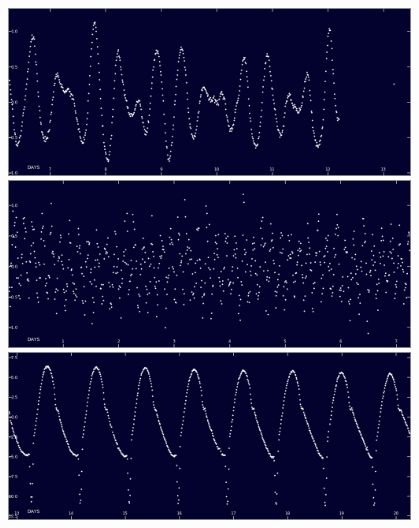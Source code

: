 \documentclass{beamer}
\begin{document}
\begin{frame}
\begin{columns}[c]
\begin{figure}
\includegraphics[width=0.95\textwidth]{img/zooniverse.org/starspots_moderate.png}
\includegraphics[width=0.95\textwidth]{img/zooniverse.org/startspots_fast.png}
\includegraphics[width=0.95\textwidth]{img/zooniverse.org/eclipsing_binaries_another.png}
\captionsetup{labelformat=empty}
\end{figure}
\end{columns}
\end{frame}
\end{document}
